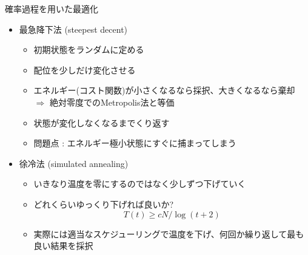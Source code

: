 \begin{frame}[t,fragile]{確率過程を用いた最適化}
  \begin{itemize}
  \item 最急降下法 (steepest decent)%
    \begin{itemize}
    \item 初期状態をランダムに定める
    \item 配位を少しだけ変化させる
    \item エネルギー(コスト関数)が小さくなるなら採択、大きくなるなら棄却 $\Rightarrow$ 絶対零度でのMetropolis法と等価
    \item 状態が変化しなくなるまでくり返す
    \item 問題点 : エネルギー極小状態にすぐに捕まってしまう
    \end{itemize}
  \item 徐冷法 (simulated annealing)%
    \begin{itemize}
    \item いきなり温度を零にするのではなく少しずつ下げていく
    \item どれくらいゆっくり下げれば良いか?
      \[
      T(t) \ge cN / \log(t+2)
      \]
    \item 実際には適当なスケジューリングで温度を下げ、何回か繰り返して最も良い結果を採択
    \end{itemize}
  \end{itemize}
\end{frame}
